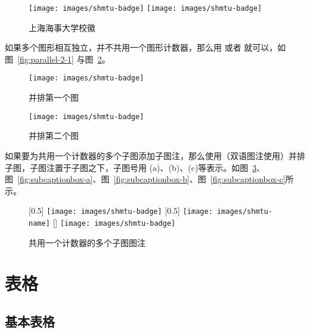 \begin{figure}[!htp]
  \centering
  \texttt{[image: images/shmtu-badge]}
  \hspace{1cm}
  \texttt{[image: images/shmtu-badge]}
  \caption{上海海事大学校徽}
  \label{fig:parallel-1}
\end{figure}

如果多个图形相互独立，并不共用一个图形计数器，那么用  或者 就可以，如图~\ref{fig:parallel-2-1} 与图~\ref{fig:parallel-2-2}。

\begin{figure}[!htp]
  \begin{minipage}{0.48\textwidth}
    \centering
    \texttt{[image: images/shmtu-badge]}
    \caption{并排第一个图}
    \label{fig:parallel-2-1}
  \end{minipage}
  \hfill
  \begin{minipage}{0.48\textwidth}
    \centering
    \texttt{[image: images/shmtu-badge]}
    \caption{并排第二个图}
    \label{fig:parallel-2-2}
  \end{minipage}
\end{figure}

如果要为共用一个计数器的多个子图添加子图注，那么使用（双语图注使用）并排子图，子图注置于子图之下，子图号用 (a)、(b)、(c)等表示。如图~\ref{fig:subcaptionbox}、图~\ref{fig:subcaptionbox-a}、图~\ref{fig:subcaptionbox-b}、图~\ref{fig:subcaptionbox-c}所示。

\begin{figure}[!htp]
    [0.5\textwidth]{%
      \texttt{[image: images/shmtu-badge]}
    }
  \hfill
    [0.5\textwidth]{%
      \texttt{[image: images/shmtu-name]}
    }
  \hfill
    [\textwidth]{%
      \texttt{[image: images/shmtu-badge]}
  }
  \caption{共用一个计数器的多个子图图注}
  \label{fig:subcaptionbox}
\end{figure}

\section{表格}

\subsection{基本表格}

